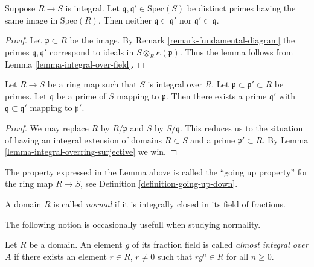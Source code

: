 \begin{lemma}
\label{lemma-integral-no-inclusion}
Suppose $R \to S$ is integral.
Let $\mathfrak q, \mathfrak q' \in \text{Spec}(S)$
be distinct primes
having the same image in $\text{Spec}(R)$.
Then neither $\mathfrak q \subset \mathfrak q'$
nor $\mathfrak q' \subset \mathfrak q$.
\end{lemma}

\begin{proof}
Let $\mathfrak p \subset R$ be the image.
By Remark \ref{remark-fundamental-diagram}
the primes $\mathfrak q, \mathfrak q'$
correspond to ideals in
$S \otimes_R \kappa(\mathfrak p)$.
Thus the lemma follows from Lemma \ref{lemma-integral-over-field}.
\end{proof}

\begin{lemma}
\label{lemma-integral-going-up}
Let $R \to S$ be a ring map such that
$S$ is integral over $R$.
Let $\mathfrak p \subset \mathfrak p' \subset R$
be primes. Let $\mathfrak q$ be a prime of $S$ mapping
to $\mathfrak p$. Then there exists a prime $\mathfrak q'$
with $\mathfrak q \subset \mathfrak q'$
mapping to $\mathfrak p'$.
\end{lemma}

\begin{proof}
We may replace $R$ by $R/\mathfrak p$ and $S$ by $S/\mathfrak q$. 
This reduces us to the situation of having an integral
extension of domains $R \subset S$ and a prime $\mathfrak p' \subset R$.
By Lemma \ref{lemma-integral-overring-surjective} we win.
\end{proof}

\noindent
The property expressed in the Lemma above is called
the ``going up property'' for the ring map $R \to S$,
see Definition \ref{definition-going-up-down}.

\begin{definition}
\label{definition-ring-normal}
A domain $R$ is called {\it normal} if it is integrally
closed in its field of fractions.
\end{definition}

\noindent
The following notion is occasionally usefull when
studying normality.

\begin{definition}
\label{definition-almost-integral}
Let $R$ be a domain. An element $g$ of its fraction
field is called {\it almost integral over $A$}
if there exists an element $r \in R$, $r\not=0$
such that $rg^n \in R$ for all $n \geq 0$.
\end{definition}

